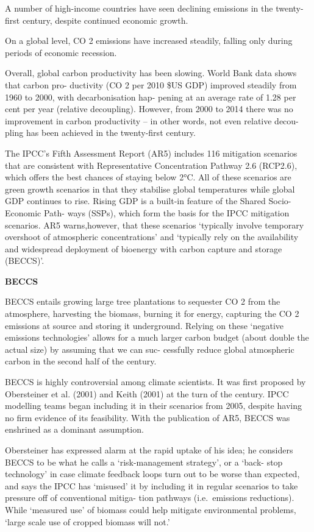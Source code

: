 \documentclass[
]{book}
\begin{document}
A number of high-income countries have seen declining emissions in the twenty-first century,
despite continued economic growth.

On a global level, CO 2 emissions have increased steadily, falling only during periods of economic
recession.

Overall, global carbon productivity has been slowing. World Bank data shows that carbon pro-
ductivity (CO 2 per 2010 \$US GDP) improved steadily from 1960 to 2000, with decarbonisation hap-
pening at an average rate of 1.28 per cent per year (relative decoupling). However, from 2000 to
2014 there was no improvement in carbon productivity -- in other words, not even relative decou-
pling has been achieved in the twenty-first century.

The IPCC's Fifth Assessment Report (AR5) includes 116 mitigation scenarios that are consistent
with Representative Concentration Pathway 2.6 (RCP2.6), which offers the best chances of staying
below 2°C. All of these scenarios are green growth scenarios in that they stabilise global temperatures
while global GDP continues to rise. Rising GDP is a built-in feature of the Shared Socio-Economic Path-
ways (SSPs), which form the basis for the IPCC mitigation scenarios.
AR5 warns,however, that these scenarios `typically involve
temporary overshoot of atmospheric concentrations'
and `typically rely on the availability and widespread deployment of bioenergy with carbon capture
and storage (BECCS)'.

\textbf{BECCS}

BECCS entails growing large tree plantations to
sequester CO 2 from the atmosphere, harvesting the biomass, burning it for energy, capturing the CO 2
emissions at source and storing it underground. Relying on these `negative emissions technologies'
allows for a much larger carbon budget (about double the actual size) by assuming that we can suc-
cessfully reduce global atmospheric carbon in the second half of the century.

BECCS is highly controversial among climate scientists. It was first proposed by Obersteiner et al.
(2001) and Keith (2001) at the turn of the century. IPCC modelling teams began including it in their
scenarios from 2005, despite having no firm evidence of its feasibility. With the publication of AR5,
BECCS was enshrined as a dominant assumption.

Obersteiner has expressed alarm at the rapid
uptake of his idea; he considers BECCS to be what he calls a `risk-management strategy', or a `back-
stop technology' in case climate feedback loops turn out to be worse than expected, and says the
IPCC has `misused' it by including it in regular scenarios to take pressure off of conventional mitiga-
tion pathways (i.e.~emissions reductions).
While `measured use' of biomass could help mitigate environmental problems,
`large scale use of cropped biomass will not.'
\end{document}
